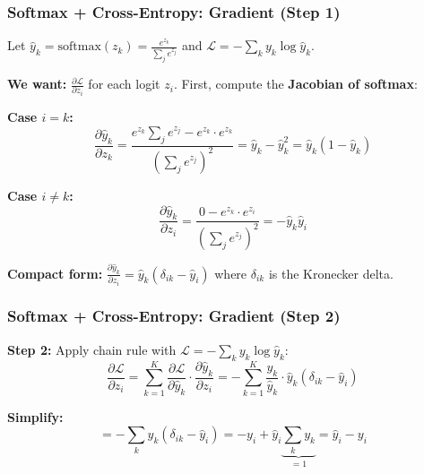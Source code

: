 \documentclass[notes,11pt, aspectratio=169]{beamer}
\newcommand{\pd}[2]{\frac{\partial #1}{\partial #2}}
\begin{document}
\begin{frame}
\frametitle{Softmax + Cross-Entropy: Gradient (Step 1)}

Let $\hat{y}_k = \text{softmax}(z_k) = \frac{e^{z_k}}{\sum_j e^{z_j}}$ and $\mathcal{L} = -\sum_k y_k \log \hat{y}_k$.

\vspace{6pt}
\textbf{We want:} $\pd{\mathcal{L}}{z_i}$ for each logit $z_i$. First, compute the \textbf{Jacobian of softmax}:

\vspace{4pt}
\textbf{Case $i = k$:}
\[
    \pd{\hat{y}_k}{z_k} = \frac{e^{z_k}\sum_j e^{z_j} - e^{z_k} \cdot e^{z_k}}{(\sum_j e^{z_j})^2} = \hat{y}_k - \hat{y}_k^2 = \hat{y}_k(1 - \hat{y}_k)
\]

\textbf{Case $i \neq k$:}
\[
    \pd{\hat{y}_k}{z_i} = \frac{0 - e^{z_k} \cdot e^{z_i}}{(\sum_j e^{z_j})^2} = -\hat{y}_k \hat{y}_i
\]

\vspace{6pt}
\textbf{Compact form:} \quad $\pd{\hat{y}_k}{z_i} = \hat{y}_k(\delta_{ik} - \hat{y}_i)$ \quad where $\delta_{ik}$ is the Kronecker delta.
\end{frame}

\begin{frame}
\frametitle{Softmax + Cross-Entropy: Gradient (Step 2)}

\textbf{Step 2:} Apply chain rule with $\mathcal{L} = -\sum_k y_k \log \hat{y}_k$:
\[
    \pd{\mathcal{L}}{z_i} = \sum_{k=1}^{K} \pd{\mathcal{L}}{\hat{y}_k} \cdot \pd{\hat{y}_k}{z_i} = -\sum_{k=1}^{K} \frac{y_k}{\hat{y}_k} \cdot \hat{y}_k(\delta_{ik} - \hat{y}_i)
\]

\vspace{4pt}
\textbf{Simplify:}
\[
    = -\sum_{k} y_k(\delta_{ik} - \hat{y}_i) = -y_i + \hat{y}_i \underbrace{\sum_{k} y_k}_{=1} = \hat{y}_i - y_i
\]

\vspace{6pt}
\end{frame}
\end{document}
